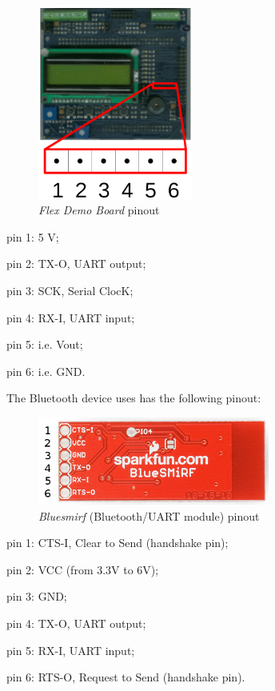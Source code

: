 \documentclass[twoside]{article}
\begin{document}
\begin{multicols}{2}
\begin{figure}[H]
  \centering
  \includegraphics[width=2in]{img/flex_demo_board_pinout}
  \caption{\textit{Flex Demo Board} pinout}
\end{figure}

\begin{compactitem}
\item pin 1: 5 V;
\item pin 2: TX-O, UART output;
\item pin 3: SCK, Serial ClocK;
\item pin 4: RX-I, UART input;
\item pin 5: i.e. Vout;
\item pin 6: i.e. GND.
\end{compactitem}

The Bluetooth device uses has the following pinout:

\begin{figure}[H]
  \centering
  \includegraphics[width=3in]{img/bluesmirf_pinout}
  \caption{\textit{Bluesmirf} (Bluetooth/UART module) pinout}
\end{figure}

\begin{compactitem}
\item pin 1: CTS-I, Clear to Send (handshake pin);
\item pin 2: VCC (from 3.3V to 6V);
\item pin 3: GND;
\item pin 4: TX-O, UART output;
\item pin 5: RX-I, UART input;
\item pin 6: RTS-O, Request to Send (handshake pin).
\end{compactitem}


\end{multicols}
\end{document}

